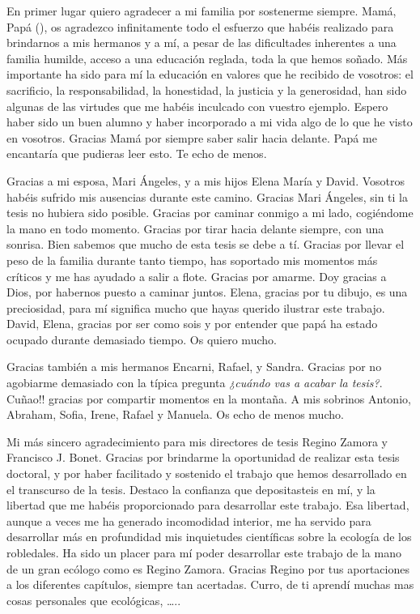 %
\label{sec:acknowledgement}

En primer lugar quiero agradecer a mi familia por sostenerme siempre. Mamá, Papá (\dag), os agradezco infinitamente todo el esfuerzo que habéis realizado para brindarnos a mis hermanos y a mí, a pesar de las dificultades inherentes a una familia humilde, acceso a una educación reglada, toda la que hemos soñado. Más importante ha sido para mí la educación en valores que he recibido de vosotros: el sacrificio, la responsabilidad, la honestidad, la justicia y la generosidad, han sido algunas de las virtudes que me habéis inculcado con vuestro ejemplo. Espero haber sido un buen alumno y haber incorporado a mi vida algo de lo que he visto en vosotros. Gracias Mamá por siempre saber salir hacia delante. Papá me encantaría que pudieras leer esto. Te echo de menos. 

Gracias a mi esposa, Mari Ángeles, y a mis hijos Elena María y David. Vosotros habéis sufrido mis ausencias durante este camino. Gracias Mari Ángeles, sin ti la tesis no hubiera sido posible. Gracias por caminar conmigo a mi lado, cogiéndome la mano en todo momento. Gracias por tirar hacia delante siempre, con una sonrisa. Bien sabemos que mucho de esta tesis se debe a tí. Gracias por llevar el peso de la familia durante tanto tiempo, has soportado mis momentos más críticos y me has ayudado a salir a flote. Gracias por amarme. Doy gracias a Dios, por habernos puesto a caminar juntos. Elena, gracias por tu dibujo, es una preciosidad, para mí significa mucho que hayas querido ilustrar este trabajo. David, Elena, gracias por ser como sois y por entender que papá ha estado ocupado durante demasiado tiempo. Os quiero mucho. 

Gracias también a mis hermanos Encarni, Rafael, y Sandra. Gracias por no agobiarme demasiado con la típica pregunta \emph{¿cuándo vas a acabar la tesis?}. Cuñao!! gracias por compartir momentos en la montaña. A mis sobrinos Antonio, Abraham, Sofia, Irene, Rafael y Manuela. Os echo de menos mucho. 

Mi más sincero agradecimiento para mis directores de tesis Regino Zamora y Francisco J. Bonet. Gracias por brindarme la oportunidad de realizar esta tesis doctoral, y por haber facilitado y sostenido el trabajo que hemos desarrollado en el transcurso de la tesis. Destaco la confianza que depositasteis en mí, y la libertad que me habéis proporcionado para desarrollar este trabajo. Esa libertad, aunque a veces me ha generado incomodidad interior, me ha servido para desarrollar más en profundidad mis inquietudes científicas sobre la ecología de los robledales. Ha sido un placer para mí poder desarrollar este trabajo de la mano de un gran ecólogo como es Regino Zamora. Gracias Regino por tus aportaciones a los diferentes capítulos, siempre tan acertadas. Curro, de ti aprendí muchas mas cosas personales que ecológicas,  ….. 

